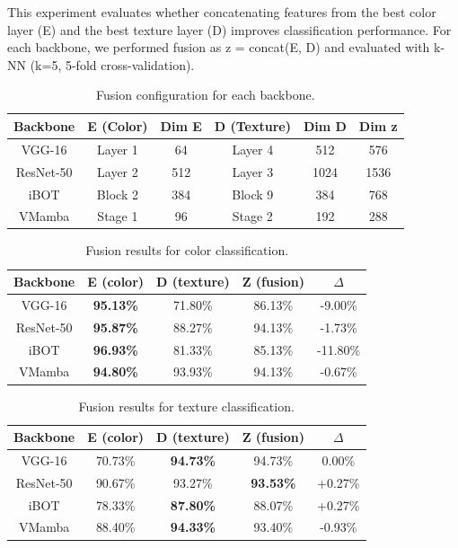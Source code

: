 \documentclass[conference]{IEEEtran}
\begin{document}
This experiment evaluates whether concatenating features from the best color layer (E) and the best texture layer (D) improves classification performance. For each backbone, we performed fusion as z = concat(E, D) and evaluated with k-NN (k=5, 5-fold cross-validation).

\begin{table}[htbp]
\caption{Fusion configuration for each backbone.}
\begin{center}
\begin{tabular}{c|c|c|c|c|c}
\hline
\textbf{Backbone} & \textbf{E (Color)} & \textbf{Dim E} & \textbf{D (Texture)} & \textbf{Dim D} & \textbf{Dim z}\\
\hline
VGG-16 & Layer 1 & 64 & Layer 4 & 512 & 576 \\
ResNet-50 & Layer 2 & 512 & Layer 3 & 1024 & 1536 \\
iBOT & Block 2 & 384 & Block 9 & 384 & 768 \\
VMamba & Stage 1 & 96 & Stage 2 & 192 & 288 \\
\hline
\end{tabular}
\label{tab5}
\end{center}
\end{table}

\begin{table}[htbp]
\caption{Fusion results for color classification.}
\begin{center}
\begin{tabular}{c|c|c|c|c}
\hline
\textbf{Backbone} & \textbf{E (color)} & \textbf{D (texture)} & \textbf{Z (fusion)} & \textbf{$\Delta$}\\
\hline
VGG-16 & \textbf{95.13\%} & 71.80\% & 86.13\% & -9.00\% \\
ResNet-50 & \textbf{95.87\%} & 88.27\% & 94.13\% & -1.73\% \\
iBOT & \textbf{96.93\%} & 81.33\% & 85.13\% & -11.80\% \\
VMamba & \textbf{94.80\%} & 93.93\% & 94.13\% & -0.67\% \\
\hline
\end{tabular}
\label{tab6}
\end{center}
\end{table}

\begin{table}[htbp]
\caption{Fusion results for texture classification.}
\begin{center}
\begin{tabular}{c|c|c|c|c}
\hline
\textbf{Backbone} & \textbf{E (color)} & \textbf{D (texture)} & \textbf{Z (fusion)} & \textbf{$\Delta$}\\
\hline
VGG-16 & 70.73\% & \textbf{94.73\%} & 94.73\% & 0.00\% \\
ResNet-50 & 90.67\% & 93.27\% & \textbf{93.53\%} & +0.27\% \\
iBOT & 78.33\% & \textbf{87.80\%} & 88.07\% & +0.27\% \\
VMamba & 88.40\% & \textbf{94.33\%} & 93.40\% & -0.93\% \\
\hline
\end{tabular}
\label{tab7}
\end{center}
\end{table}
\end{document}
